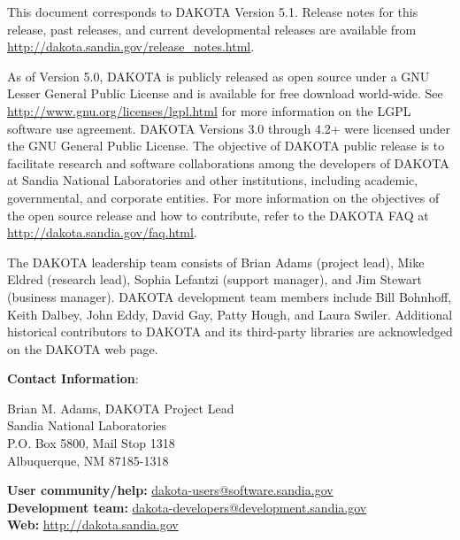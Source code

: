This document corresponds to DAKOTA Version 5.1.  Release notes for
this release, past releases, and current developmental releases are
available from
\url{http://dakota.sandia.gov/release_notes.html}.

As of Version 5.0, DAKOTA is publicly released as open source under a
GNU Lesser General Public License and is available for free download
world-wide.  See \url{http://www.gnu.org/licenses/lgpl.html} for more
information on the LGPL software use agreement.  DAKOTA Versions 3.0
through 4.2+ were licensed under the GNU General Public License.  The
objective of DAKOTA public release is to facilitate research and
software collaborations among the developers of DAKOTA at Sandia
National Laboratories and other institutions, including academic,
governmental, and corporate entities. For more information on the
objectives of the open source release and how to contribute, refer to
the DAKOTA FAQ at \url{http://dakota.sandia.gov/faq.html}.

The DAKOTA leadership team consists of Brian Adams (project lead),
Mike Eldred (research lead), Sophia Lefantzi (support manager), and
Jim Stewart (business manager).  DAKOTA development team members
include Bill Bohnhoff, Keith Dalbey, John Eddy, David Gay, Patty
Hough, and Laura Swiler.  Additional historical contributors to DAKOTA
and its third-party libraries are acknowledged on the DAKOTA web page.

\textbf{Contact Information}:

{\small Brian M. Adams, DAKOTA Project Lead}\\
{\small Sandia National Laboratories}\\
{\small P.O. Box 5800, Mail Stop 1318}\\
{\small Albuquerque, NM 87185-1318}

{\small {\bf User community/help:} \href{mailto:dakota-users@software.sandia.gov}{dakota-users@software.sandia.gov}}\\
{\small {\bf Development team:} \href{mailto:dakota-developers@development.sandia.gov}{dakota-developers@development.sandia.gov}}\\
{\small {\bf Web:} \url{http://dakota.sandia.gov}}
